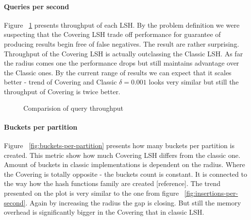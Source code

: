 \paragraph{Queries per second}

Figure ~\ref{fig:queries-per-second} presents throughput of each LSH. By the problem definition we were suspecting that the Covering LSH trade off performance for guarantee of producing results begin free of false negatives. The result are rather surprising. Throughput of the Covering LSH is actually outclassing the Classic LSH. As far the radius comes one the performance drops but still maintains advantage over the Classic ones. By the current range of results we can expect that it scales better - trend of Covering and Classic $\delta = 0.001$ looks very similar but still the throughput of Covering is twice better.

\begin{figure}[ht]

  \caption{Comparision of query throughput}
  \label{fig:queries-per-second}
\end{figure}

\paragraph{Buckets per partition}

Figure ~\ref{fig:buckets-per-partition} presents how many buckets per partition is created. This metric show how much Covering LSH differs from the classic one. Amount of buckets in classic implementations is dependent on the radius. Where the Covering is totally opposite - the buckets count is constant. It is connected to the way how the hash functions family are created [reference]. The trend presented on the plot is very similar to the one from figure ~\ref{fig:insertions-per-second}. Again by increasing the radius the gap is closing. But still the memory overhead is significantly bigger in the Covering that in classic LSH.

